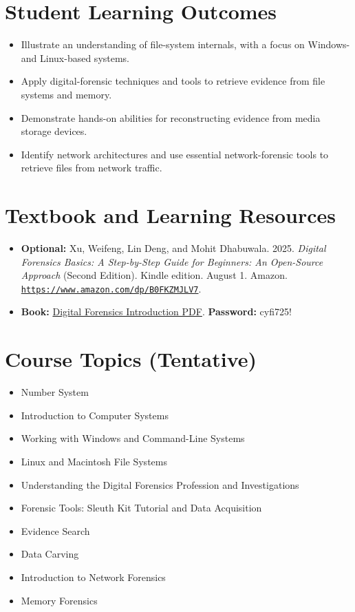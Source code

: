 \documentclass[10pt]{article}
\begin{document}
\section{Student Learning Outcomes}
\begin{itemize}
  \item Illustrate an understanding of file-system internals, with a focus on Windows- and Linux-based systems.
  \item Apply digital-forensic techniques and tools to retrieve evidence from file systems and memory.
  \item Demonstrate hands-on abilities for reconstructing evidence from media storage devices.
  \item Identify network architectures and use essential network-forensic tools to retrieve files from network traffic.
\end{itemize}

\section{Textbook and Learning Resources}
\begin{itemize}
  \item \textbf{Optional:} Xu, Weifeng, Lin Deng, and Mohit Dhabuwala. 2025. \emph{Digital Forensics Basics: A Step-by-Step Guide for Beginners: An Open-Source Approach} (Second Edition). Kindle edition. August 1. Amazon. \href{https://www.amazon.com/dp/B0FKZMJLV7}{\nolinkurl{https://www.amazon.com/dp/B0FKZMJLV7}}.
  \item \textbf{Book:} \href{https://github.com/frankwxu/digital-forensics-lab/blob/main/papers/books/Digital_Forensics_Introduction.pdf}{Digital Forensics Introduction PDF}. \textbf{Password:} cyfi725!
\end{itemize}

\section{Course Topics (Tentative)}
\begin{itemize}
  \item Number System
  \item Introduction to Computer Systems
  \item Working with Windows and Command-Line Systems
  \item Linux and Macintosh File Systems
  \item Understanding the Digital Forensics Profession and Investigations
  \item Forensic Tools: Sleuth Kit Tutorial and Data Acquisition
  \item Evidence Search
  \item Data Carving
  \item Introduction to Network Forensics
  \item Memory Forensics
\end{itemize}
\end{document}
